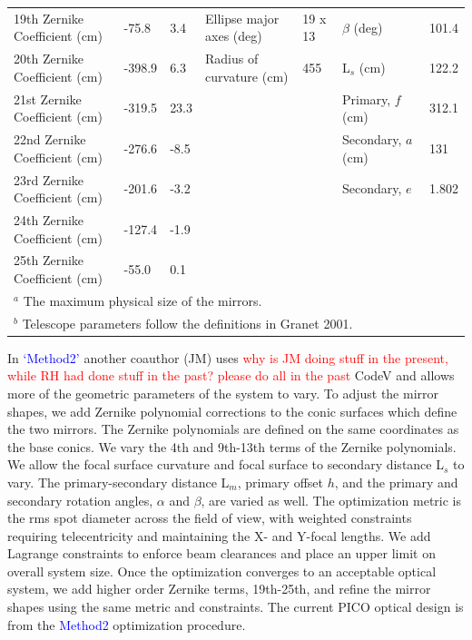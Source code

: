 \documentclass[]{spie}  %
\newcommand{\comr}[1]{\textcolor{red}{#1}}
\newcommand{\comb}[1]{\textcolor{blue}{#1}}
\begin{document}
\begin{table}[ht]
\begin{adjustbox}{width=1.05\textwidth}
\begin{tabular}{|l|llll||ll|}
19th Zernike Coefficient (cm) & -75.8             & 3.4               & Ellipse major axes (deg)  & 19 x 13  & $\beta$  (deg)                 & 101.4 \\   
20th Zernike Coefficient (cm) & -398.9            & 6.3               & Radius of curvature (cm)  & 455      & L$_s$ (cm)                     & 122.2 \\   
21st Zernike Coefficient (cm) & -319.5            & 23.3              &                           &          & Primary, $f$ (cm)              & 312.1 \\   
22nd Zernike Coefficient (cm) & -276.6            & -8.5              &                           &          & Secondary, $a$ (cm)            & 131   \\   
23rd Zernike Coefficient (cm) & -201.6            & -3.2              &                           &          & Secondary, $e$                 &  1.802  \\
24th Zernike Coefficient (cm) & -127.4            & -1.9              &                           &          &                                &       \\
25th Zernike Coefficient (cm) & -55.0             & 0.1               &                           &          &                                &       \\\hline
\multicolumn{7}{l}{\footnotesize  $^a$ The maximum physical size of the mirrors.}\\
\multicolumn{7}{l}{\footnotesize  $^b$ Telescope parameters follow the definitions in Granet 2001.\cite{granet2001}} \\
\end{tabular}
\end{adjustbox}
\end{table}

In \comb{`Method2'} another coauthor (JM) uses \comr{why is JM doing stuff in the present, while RH had done
stuff in the past? please do all in the past} CodeV and allows more of the geometric 
parameters of the system to vary.  To adjust the 
mirror shapes, we add Zernike polynomial corrections to the conic surfaces which define the two mirrors.
The Zernike polynomials are defined on the same coordinates as the base conics.  
We vary the 4th and 9th-13th terms of the Zernike polynomials. We allow the focal surface curvature 
and focal surface to secondary distance L$_s$ to vary.  The primary-secondary distance L$_m$, primary offset $h$, 
and the primary and secondary rotation angles, $\alpha$ and $\beta$, are varied as well.  The optimization 
metric is the rms spot diameter across the field of view, with weighted constraints requiring telecentricity and 
maintaining the X- and Y-focal lengths.  We add Lagrange constraints 
to enforce beam clearances and place an upper limit on overall system size.  Once the optimization converges to 
an acceptable optical system, we add higher order Zernike terms, 19th-25th, and refine 
the mirror shapes using the same metric and constraints. 
The current PICO optical design is from the \comb{Method2} optimization procedure.
\end{document}

